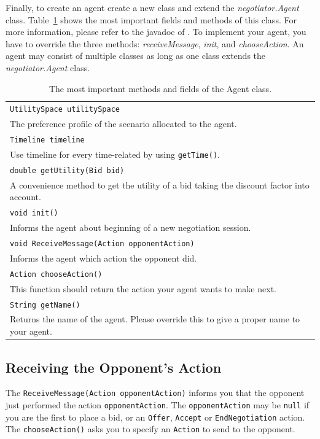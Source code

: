 \documentclass[]{article}
\begin{document}
Finally, to create an agent create a new class and extend the \textit{negotiator.Agent} class. Table~\ref{tab:agentclass} shows the most important fields and methods of this class. For more information, please refer to the javadoc of \Genius. To implement your agent, you have to override the three methods: \textit{receiveMessage}, \textit{init}, and \textit{chooseAction}. An agent may consist of multiple classes as long as one class extends the \textit{negotiator.Agent} class.

\begin{table}[h]
\begin{tabular}{m{}}
\hline
\texttt{UtilitySpace utilitySpace}\\
The preference profile of the scenario allocated to the agent.\\
\hline
\texttt{Timeline timeline}\\
Use timeline for every time-related by using \texttt{getTime()}.\\
\hline
\texttt{double getUtility(Bid bid)}\\
A convenience method to get the utility of a bid taking the discount factor into account.\\
\hline
\texttt{void init()}\\
Informs the agent about beginning of a new negotiation session.\\
\hline
\texttt{void ReceiveMessage(Action opponentAction)}\\
Informs the agent which action the opponent did.\\
\hline
\texttt{Action chooseAction()}\\
This function should return the action your agent wants to make next.\\
\hline
\texttt{String getName()}\\
Returns the name of the agent. Please override this to give a proper name to your agent.\\
\hline
\end{tabular}
\caption{The most important methods and fields of the Agent class.}
\label{tab:agentclass}
\end{table}

\subsection{Receiving the Opponent's Action}
The \texttt{ReceiveMessage(Action opponentAction)} informs you that the opponent just performed the action \texttt{opponentAction}. The \texttt{opponentAction} may be  \texttt{null} if you are the first to place a bid, or an \texttt{Offer}, \texttt{Accept} or \texttt{EndNegotiation} action.
The \texttt{chooseAction()} asks you to specify an \texttt{Action} to send to the opponent.
\end{document}
